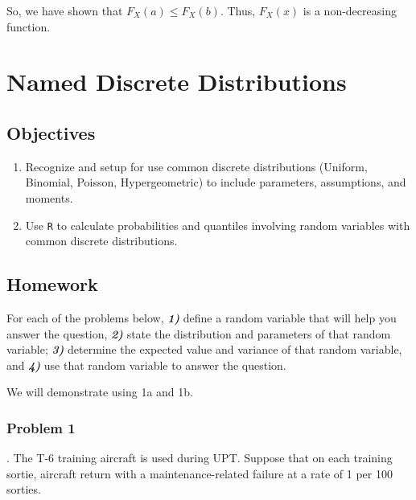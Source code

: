 \documentclass[
]{book}
\providecommand{\tightlist}{%
  \setlength{\itemsep}{0pt}\setlength{\parskip}{0pt}}
\begin{document}
So, we have shown that \(F_X(a)\leq F_X(b)\). Thus, \(F_X(x)\) is a non-decreasing function.

\hypertarget{DISCRETENAMED}{%
\chapter{Named Discrete Distributions}\label{DISCRETENAMED}}

\newcommand{\E}{\mbox{E}}
\newcommand{\Var}{\mbox{Var}}
\newcommand{\Cov}{\mbox{Cov}}
\newcommand{\Prob}{\mbox{P}}
\newcommand*\diff{\mathop{}\!\mathrm{d}}

\hypertarget{objectives-11}{%
\section{Objectives}\label{objectives-11}}

\begin{enumerate}
\def\labelenumi{\arabic{enumi})}
\tightlist
\item
  Recognize and setup for use common discrete distributions (Uniform, Binomial, Poisson, Hypergeometric) to include parameters, assumptions, and moments.\\
\item
  Use \texttt{R} to calculate probabilities and quantiles involving random variables with common discrete distributions.
\end{enumerate}

\hypertarget{homework-11}{%
\section{Homework}\label{homework-11}}

For each of the problems below, \textbf{\emph{1)}} define a random variable that will help you answer the question, \textbf{\emph{2)}} state the distribution and parameters of that random variable; \textbf{\emph{3)}} determine the expected value and variance of that random variable, and \textbf{\emph{4)}} use that random variable to answer the question.

We will demonstrate using 1a and 1b.

\hypertarget{problem-1-11}{%
\subsection{Problem 1}\label{problem-1-11}}

. The T-6 training aircraft is used during UPT. Suppose that on each training sortie, aircraft return with a maintenance-related failure at a rate of 1 per 100 sorties.
\end{document}
